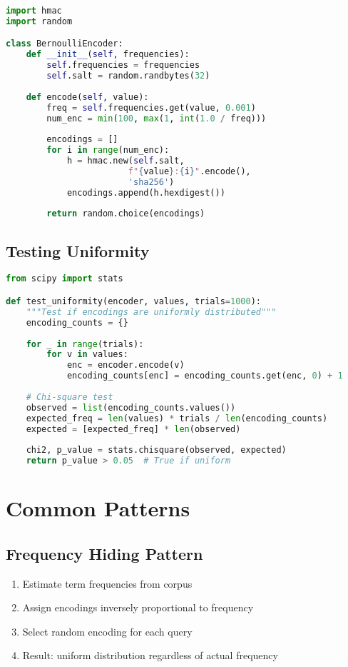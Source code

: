 \begin{lstlisting}[language=Python]
import hmac
import random

class BernoulliEncoder:
    def __init__(self, frequencies):
        self.frequencies = frequencies
        self.salt = random.randbytes(32)
    
    def encode(self, value):
        freq = self.frequencies.get(value, 0.001)
        num_enc = min(100, max(1, int(1.0 / freq)))
        
        encodings = []
        for i in range(num_enc):
            h = hmac.new(self.salt, 
                        f"{value}:{i}".encode(),
                        'sha256')
            encodings.append(h.hexdigest())
        
        return random.choice(encodings)
\end{lstlisting}

\subsection{Testing Uniformity}

\begin{lstlisting}[language=Python]
from scipy import stats

def test_uniformity(encoder, values, trials=1000):
    """Test if encodings are uniformly distributed"""
    encoding_counts = {}
    
    for _ in range(trials):
        for v in values:
            enc = encoder.encode(v)
            encoding_counts[enc] = encoding_counts.get(enc, 0) + 1
    
    # Chi-square test
    observed = list(encoding_counts.values())
    expected_freq = len(values) * trials / len(encoding_counts)
    expected = [expected_freq] * len(observed)
    
    chi2, p_value = stats.chisquare(observed, expected)
    return p_value > 0.05  # True if uniform
\end{lstlisting}

\section{Common Patterns}

\subsection{Frequency Hiding Pattern}
\begin{enumerate}
\item Estimate term frequencies from corpus
\item Assign encodings inversely proportional to frequency
\item Select random encoding for each query
\item Result: uniform distribution regardless of actual frequency
\end{enumerate}


